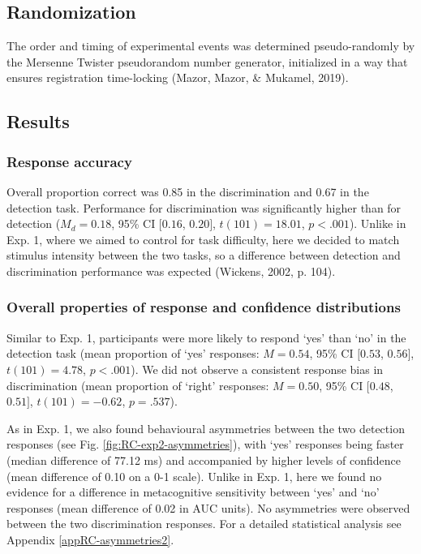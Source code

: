 \documentclass[12pt,twoside]{reedthesis}
\begin{document}
\hypertarget{randomization-2}{%
\subsection{Randomization}\label{randomization-2}}

The order and timing of experimental events was determined pseudo-randomly by the Mersenne Twister pseudorandom number generator, initialized in a way that ensures registration time-locking (Mazor, Mazor, \& Mukamel, 2019).

\hypertarget{results-5}{%
\subsection{Results}\label{results-5}}

\hypertarget{response-accuracy-1}{%
\subsubsection{Response accuracy}\label{response-accuracy-1}}

Overall proportion correct was 0.85 in the discrimination and 0.67 in the detection task. Performance for discrimination was significantly higher than for detection (\(M_d = 0.18\), 95\% CI \([0.16\), \(0.20]\), \(t(101) = 18.01\), \(p < .001\)). Unlike in Exp. 1, where we aimed to control for task difficulty, here we decided to match stimulus intensity between the two tasks, so a difference between detection and discrimination performance was expected (Wickens, 2002, p. 104).

\hypertarget{overall-properties-of-response-and-confidence-distributions}{%
\subsubsection{Overall properties of response and confidence distributions}\label{overall-properties-of-response-and-confidence-distributions}}

Similar to Exp. 1, participants were more likely to respond `yes' than `no' in the detection task (mean proportion of `yes' responses: \(M = 0.54\), 95\% CI \([0.53\), \(0.56]\), \(t(101) = 4.78\), \(p < .001\)). We did not observe a consistent response bias in discrimination (mean proportion of `right' responses: \(M = 0.50\), 95\% CI \([0.48\), \(0.51]\), \(t(101) = -0.62\), \(p = .537\)).

As in Exp. 1, we also found behavioural asymmetries between the two detection responses (see Fig. \ref{fig:RC-exp2-asymmetries}), with `yes' responses being faster (median difference of 77.12 ms) and accompanied by higher levels of confidence (mean difference of 0.10 on a 0-1 scale). Unlike in Exp. 1, here we found no evidence for a difference in metacognitive sensitivity between `yes' and `no' responses (mean difference of 0.02 in AUC units). No asymmetries were observed between the two discrimination responses. For a detailed statistical analysis see Appendix \ref{appRC-asymmetries2}.
\end{document}
